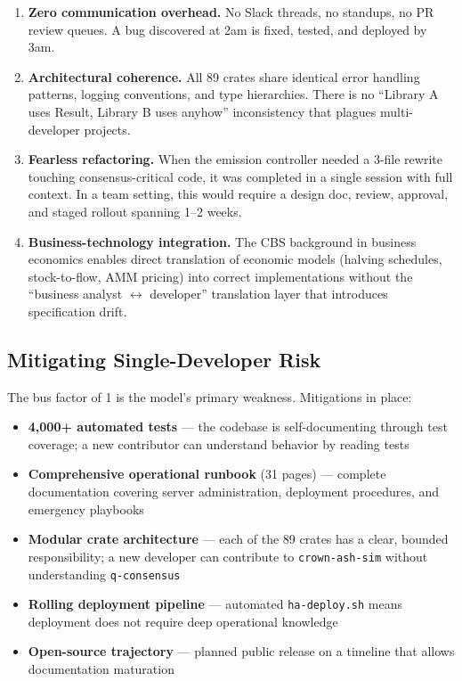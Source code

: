 \documentclass[11pt,a4paper]{article}
\begin{document}
\begin{enumerate}[leftmargin=*]
    \item \textbf{Zero communication overhead.} No Slack threads, no standups, no PR review queues. A bug discovered at 2am is fixed, tested, and deployed by 3am.

    \item \textbf{Architectural coherence.} All 89 crates share identical error handling patterns, logging conventions, and type hierarchies. There is no ``Library A uses Result, Library B uses anyhow'' inconsistency that plagues multi-developer projects.

    \item \textbf{Fearless refactoring.} When the emission controller needed a 3-file rewrite touching consensus-critical code, it was completed in a single session with full context. In a team setting, this would require a design doc, review, approval, and staged rollout spanning 1--2 weeks.

    \item \textbf{Business-technology integration.} The CBS background in business economics enables direct translation of economic models (halving schedules, stock-to-flow, AMM pricing) into correct implementations without the ``business analyst $\leftrightarrow$ developer'' translation layer that introduces specification drift.
\end{enumerate}

\subsection{Mitigating Single-Developer Risk}

The bus factor of 1 is the model's primary weakness. Mitigations in place:

\begin{itemize}[leftmargin=*]
    \item \textbf{4,000+ automated tests} --- the codebase is self-documenting through test coverage; a new contributor can understand behavior by reading tests
    \item \textbf{Comprehensive operational runbook} (31 pages) --- complete documentation covering server administration, deployment procedures, and emergency playbooks
    \item \textbf{Modular crate architecture} --- each of the 89 crates has a clear, bounded responsibility; a new developer can contribute to \texttt{crown-ash-sim} without understanding \texttt{q-consensus}
    \item \textbf{Rolling deployment pipeline} --- automated \texttt{ha-deploy.sh} means deployment does not require deep operational knowledge
    \item \textbf{Open-source trajectory} --- planned public release on a timeline that allows documentation maturation
\end{itemize}
\end{document}
